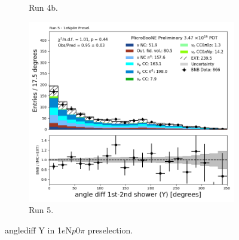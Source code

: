 \begin{figure}[H]
\begin{subfigure}[t]{0.32\linewidth}
        \caption{Run 4b.}
    \end{subfigure}%
    \hspace{0.2cm}%
    \begin{subfigure}[t]{0.32\linewidth}
        \includegraphics[width=\linewidth]{technote/Appendix_Preselection/Figures/1eNp0pi/Run5/anglediff_Y_Run5_1eNp0pi_Presel.png}
        \caption{Run 5.}
    \end{subfigure}
    \caption{anglediff Y in 1$e$N$p$0$\pi$ preselection.}
\end{figure}

